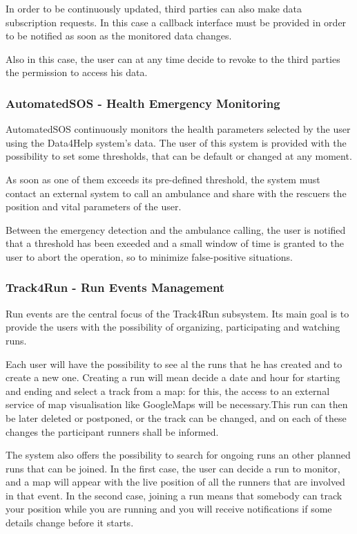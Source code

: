 In order to be continuously updated, third parties can also make data subscription requests. In this case a callback interface must be provided in order to be notified as soon as the monitored data changes.

Also in this case, the user can at any time decide to revoke to the third parties the permission to access his data.

\subsubsection{AutomatedSOS - Health Emergency Monitoring}
AutomatedSOS continuously monitors the health parameters selected by the user using the Data4Help system's data. The user of this system is provided with the possibility to set some thresholds, that can be default or changed at any moment.

As soon as one of them exceeds its pre-defined threshold, the system must contact an external system to call an ambulance and share with the rescuers the position and vital parameters of the user.

Between the emergency detection and the ambulance calling, the user is notified that a threshold has been exeeded and a small window of time is granted to the user to abort the operation, so to minimize false-positive situations.

\subsubsection{Track4Run - Run Events Management}
Run events are the central focus of the Track4Run subsystem. Its main goal is to provide the users with the possibility of organizing, participating and watching runs.

Each user will have the possibility to see al the runs that he has created and to create a new one. Creating a run will mean decide a date and hour for starting and ending and select a track from a map: for this, the access to an external service of map visualisation like GoogleMaps will be necessary.This run can then be later deleted or postponed, or the track can be changed, and on each of these changes the participant runners shall be informed.

The system also offers the possibility to search for ongoing runs an other planned runs that can be joined. In the first case, the user can decide a run to monitor, and a map will appear with the live position of all the runners that are involved in that event. In the second case, joining a run means that somebody can track your position while you are running and you will receive notifications if some details change before it starts.

